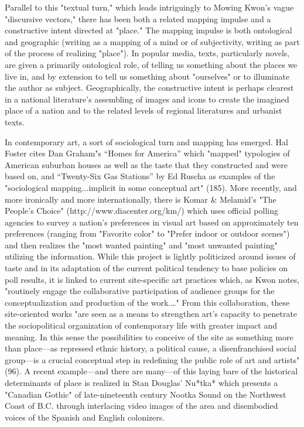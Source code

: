 Parallel to this "textual turn," which leads intriguingly to Mowing
Kwon's vague "discursive vectors," there has been both a related mapping
impulse and a constructive intent directed at "place." The mapping
impulse is both ontological and geographic (writing as a mapping of a
mind or of subjectivity, writing as part of the process of realizing
"place"). In popular media, texts, particularly novels, are given a
primarily ontological role, of telling us something about the places we
live in, and by extension to tell us something about "ourselves" or to
illuminate the author as subject. Geographically, the constructive
intent is perhaps clearest in a national literature's assembling of
images and icons to create the imagined place of a nation and to the
related levels of regional literatures and urbanist texts.

In contemporary art, a sort of sociological turn and mapping has
emerged. Hal Foster cites Dan Graham"s ``Homes for America'' which
"mapped" typologies of American suburban houses as well as the taste
that they constructed and were based on, and ``Twenty-Six Gas Stations''
by Ed Ruscha as examples of the "sociological mapping...implicit in some
conceptual art" (185). More recently, and more ironically and more
internationally, there is Komar \& Melamid's "The People's Choice"
({http://www.diacenter.org/km/}) which uses official polling agencies to
survey a nation's preferences in visual art based on approximately ten
preferences (ranging from "Favorite color" to "Prefer indoor or outdoor
scenes") and then realizes the "most wanted painting" and "most unwanted
painting" utilizing the information. While this project is lightly
politicized around issues of taste and in its adaptation of the current
political tendency to base policies on poll results, it is linked to
current site-specific art practices which, as Kwon notes, "routinely
engage the collaborative participation of audience groups for the
conceptualization and production of the work.\ldots{}" From this
collaboration, these site-oriented works "are seen as a means to
strengthen art's capacity to penetrate the sociopolitical organization
of contemporary life with greater impact and meaning. In this sense the
possibilities to conceive of the site as something more than place---as
repressed ethnic history, a political cause, a disenfranchised social
group---is a crucial conceptual step in redefining the public role of
art and artists"(96). A recent example---and there are many---of this
laying bare of the historical determinants of place is realized in Stan
Douglas' Nu*tka* which presents a "Canadian Gothic" of late-nineteenth
century Nootka Sound on the Northwest Coast of B.C. through interlacing
video images of the area and disembodied voices of the Spanish and
English colonizers.

